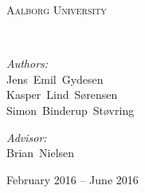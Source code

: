 \newcommand{\HRule}{\rule{\linewidth}{0.5mm}}
\begin{titlingpage}
  \begin{center}
    \vspace*{0.5cm}

    \textsc{\LARGE Aalborg University}\\[1.5cm]

    \vspace{2.5cm}

    {\HUGE \bfseries \productname{}}\\
    \vspace{0.2cm}
    {\small }

    \vspace{2.5cm}

    \begin{minipage}[t]{0.4\textwidth}
      \begin{flushleft} \large
        \emph{Authors:}\\
        Jens~Emil~Gydesen\\
        Kasper~Lind~Sørensen\\
        Simon~Binderup~Støvring
      \end{flushleft}
    \end{minipage}
    \begin{minipage}[t]{0.4\textwidth}
      \begin{flushright} \large
        \emph{Advisor:} \\
        Brian~Nielsen
      \end{flushright}
    \end{minipage}

    \vfill

    {\large February 2016 -- June 2016}

  \end{center}
\end{titlingpage}
